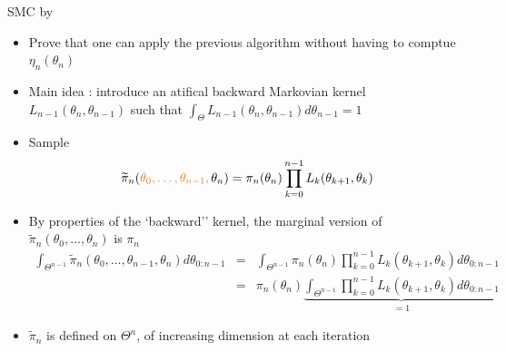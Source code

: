 \begin{frame}{SMC by \noir}

\begin{itemize}
\item Prove that one can apply the previous algorithm without having to comptue  $\eta_{n}(\theta_{n})$
\item \vert Main idea  \noir:  introduce an atifical backward Markovian kernel  $L_{n-1}(\theta_n, \theta_{n-1})$ such that $\int_{\Theta} L_{n-1}(\theta_n, \theta_{n-1}) d\theta_{n-1} = 1$

\item Sample 
$$\widetilde{\pi}_n(\vert \theta_0,\dots,\theta_{n-1}, \noir \theta_n) =\pi_n(\theta_n)\prod_{k=0}^{n-1}L_{k}(\theta_{k+1}, \theta_{k})$$

\item By properties of the `backward'' kernel, the marginal version   of $ \widetilde{\pi}_n(\theta_0,\dots, \theta_n)$ is  $\pi_n$ 
{\scriptsize
\begin{eqnarray*}
\int_{\Theta ^{n-1}}\widetilde{\pi}_n( \theta_0,\dots,\theta_{n-1}, \theta_n) d\theta_{0:n-1} &=& \int_{\Theta^{n-1}} \pi_n(\theta_n)\prod_{k=0}^{n-1}L_{k}(\theta_{k+1}, \theta_{k})d\theta_{0:n-1}\\
&=& \pi_n(\theta_n) \underbrace{\int_{\Theta^{n-1}}\prod_{k=0}^{n-1}L_{k}(\theta_{k+1}, \theta_{k})d\theta_{0:n-1}}_{=1}
\end{eqnarray*}
}

\item $\widetilde{\pi}_n$ is defined on  $\Theta^n$, of increasing dimension at each iteration
\end{itemize}


\end{frame}

